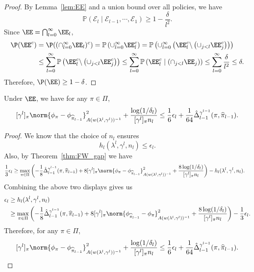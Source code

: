 \documentclass{article}
\newcommand{\pill}{\widehat{\pi}_{l-1}}
\newcommand{\1}{\mathbf{1}}
\begin{document}
\begin{proof}
By Lemma~\ref{lem:EE} and a union bound over all policies, we have  
\[\mathbb{P}\left(\mathcal{E}_{l} \mid \mathcal{E}_{l-1}, \cdots, \mathcal{E}_{1}\right) \geq 1-\frac{\delta}{l^2}.\]
Since $\EE=\bigcap_{l=0}^\infty\EE_l$, 
\begin{align*}
    \P(\EE^c)&=\P((\cap_{l=0}^\infty\EE_l)^c)=\mathbb{P}\left(\cup_{l=0}^{\infty} \EE_{l}^c\right)=\mathbb{P}\left(\cup_{l=0}^{\infty}\left(\EE_l^c \backslash\left(\cup_{j < l} \EE_{j}^c\right)\right)\right)\\
    &\leq \sum_{l=0}^{\infty} \mathbb{P}\left(\EE_l^c \backslash\left(\cup_{j<l} \EE_{j}^c\right)\right) \leq \sum_{l=0}^{\infty} \mathbb{P}\left(\EE_{l}^c \mid\left(\cap_{j<l} \EE_{j}\right)\right)\leq\sum_{l=0}^{\infty}\frac{\delta}{l^2} \leq \delta. 
\end{align*}
Therefore, $\P(\EE)\geq 1-\delta$. 
\end{proof}

\begin{lemma}\label{lem:control_of_UCB}
Under $\EE$, we have for any $\pi\in\Pi$,
\[[\gamma^l]_\pi\norm{\phi_\pi-\phi_{\pill}}_{A(w(\lambda^{l},\gamma^l))^{-1}}^2+\frac{\log(1/\delta_l)}{[\gamma^l]_\pi n_l}\leq \frac{1}{6}\epsilon_{l}+\frac{1}{64}\hat{\Delta}_{l-1}^{\gamma^{l-1}}(\pi,\pill).\]
\end{lemma}
\begin{proof}
We know that the choice of $n_l$ ensures \[h_l(\lambda^{l},\gamma^l,n_l)\leq \epsilon_l.\] Also, by Theorem~\ref{thm:FW_gap} we have
{
\small
\begin{align*}
    \frac{1}{3}\epsilon_l &\geq \max_{\pi\in\Pi} \left(-\frac{1}{8}\hat{\Delta}_{l-1}^{\gamma^{l-1}}(\pi,\pill)+8[\gamma^l]_\pi\norm{\phi_\pi-\phi_{\pill}}_{A(w(\lambda^{l},\gamma^l))^{-1}}^2+\frac{8\log(1/\delta_l)}{[\gamma^l]_\pi n_l}\right)-h_l(\lambda^{l},\gamma^l,n_l). 
\end{align*}
}
Combining the above two displays gives us  
\begin{align*}
    \epsilon_l&\geq h_l(\lambda^{l},\gamma^l,n_l)\\
    &\geq \max_{\pi\in\Pi}\left(-\frac{1}{8}\hat{\Delta}_{l-1}^{\gamma^{l-1}}(\pi,\pill)+8[\gamma^l]_\pi \norm{\phi_{\pill}-\phi_\pi}_{A(w(\lambda^{l},\gamma^l))^{-1}}^2+\frac{8\log(1/\delta_l)}{[\gamma^l]_\pi n_l}\right)-\frac{1}{3}\epsilon_l.
\end{align*}
Therefore, for any $\pi\in \Pi$,
\[[\gamma^l]_\pi\norm{\phi_\pi-\phi_{\pill}}_{A(w(\lambda^{l},\gamma^l))^{-1}}^2+\frac{\log(1/\delta_l)}{[\gamma^l]_\pi n_l}\leq \frac{1}{6}\epsilon_{l}+\frac{1}{64}\hat{\Delta}_{l-1}^{\gamma^{l-1}}(\pi,\pill).\]
\end{proof}
\end{document}
